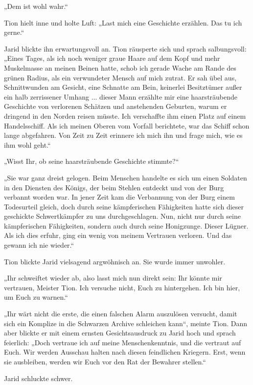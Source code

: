 „Dem ist wohl wahr.“

Tion hielt inne und holte Luft: „Last mich eine Geschichte erzählen. Das tu ich gerne.“

Jarid blickte ihn erwartungsvoll an. Tion räusperte sich und sprach salbungsvoll: „Eines Tages, als ich noch weniger graue Haare auf dem Kopf und mehr Muskelmasse an meinen Beinen hatte, schob ich gerade Wache am Rande des grünen Radius, als ein verwundeter Mensch auf mich zutrat. Er sah übel aus, Schnittwunden am Gesicht, eine Schnatte am Bein, keinerlei Besitztümer außer ein halb zerrissener Umhang ... dieser Mann erzählte mir eine haarsträubende Geschichte von verlorenen Schätzen und anstehenden Geburten, warum er dringend in den Norden reisen müsste. Ich verschaffte ihm einen Platz auf einem Handelsschiff. Als ich meinen Oberen vom Vorfall berichtete, war das Schiff schon lange abgefahren. Von Zeit zu Zeit erinnere ich mich ihn und frage mich, wie es ihm wohl geht.“

„Wisst Ihr, ob seine haarsträubende Geschichte stimmte?“

„Sie war ganz dreist gelogen. Beim Menschen handelte es sich um einen Soldaten in den Diensten des Königs, der beim Stehlen entdeckt und von der Burg verbannt worden war. In jener Zeit kam die Verbannung von der Burg einem Todesurteil gleich, doch durch seine kämpferischen Fähigkeiten hatte sich dieser geschickte Schwertkämpfer zu uns durchgeschlagen. Nun, nicht nur durch seine kämpferischen Fähigkeiten, sondern auch durch seine Honigzunge. Dieser Lügner. Als ich dies erfuhr, ging ein wenig von meinem Vertrauen verloren. Und das gewann ich nie wieder.“

Tion blickte Jarid vielsagend argwöhnisch an. Sie wurde immer unwohler.

„Ihr schweiftet wieder ab, also lasst mich nun direkt sein: Ihr könnte mir vertrauen, Meister Tion. Ich versuche nicht, Euch zu hintergehen. Ich bin hier, um Euch zu warnen.“

„Ihr wärt nicht die erste, die einen falschen Alarm auszulösen versucht, damit sich ein Komplize in die Schwarzen Archive schleichen kann“, meinte Tion. Dann aber blickte er mit einem ernsten Gesichtsausdruck zu Jarid hoch und sprach feierlich: „Doch vertraue ich auf meine Menschenkenntnis, und die vertraut auf Euch. Wir werden Ausschau halten nach diesen feindlichen Kriegern. Erst, wenn sie ausbleiben, werden wir Euch vor den Rat der Bewahrer stellen.“

Jarid schluckte schwer.


